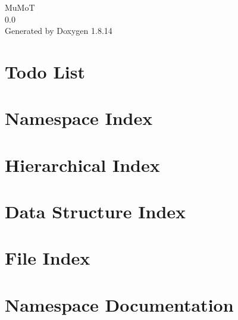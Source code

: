\documentclass[twoside]{book}
\newcommand{\+}{\discretionary{\mbox{\scriptsize$\hookleftarrow$}}{}{}}
\newcommand{\clearemptydoublepage}{%
  \newpage{\pagestyle{empty}\cleardoublepage}%
}
\begin{document}
\hypersetup{pageanchor=false,
             bookmarksnumbered=true,
             pdfencoding=unicode
            }
\begin{titlepage}
\vspace*{7cm}
\begin{center}%
{\Large Mu\+MoT \\[1ex]\large 0.\+0 }\\
\vspace*{1cm}
{\large Generated by Doxygen 1.8.14}\\
\end{center}
\end{titlepage}
\clearemptydoublepage
{}
\tableofcontents
\clearemptydoublepage
{}
\hypersetup{pageanchor=true}

\chapter{Todo List}
\label{todo}

\chapter{Namespace Index}

\chapter{Hierarchical Index}

\chapter{Data Structure Index}

\chapter{File Index}

\chapter{Namespace Documentation}


\end{document}
